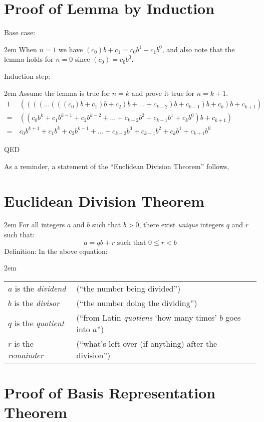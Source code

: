 \documentclass{article}
\newenvironment{jprIn}{\begin{adjustwidth}{2em}{}}{\end{adjustwidth}}
\begin{document}
\section*{Proof of Lemma by Induction}
Base case:
\begin{jprIn}
When \(n=1\) we have \((c_0)b + c_1 = c_0b^1 + c_1b^0\), and
also note that the lemma holds for \(n=0\) since \((c_0) = c_0b^0\).
\end{jprIn}
Induction step:
\begin{jprIn}
Assume the lemma is true for \(n=k\) and prove it true for \(n=k+1\).
{\small
\begin{alignat*}{1}
&((((\dots{}(((c_0)b + c_1)b + c_2)b + \dots{} + c_{k-2})b + c_{k-1})b + c_k)b + c_{k+1})\\
=\  &((c_0b^k + c_1b^{k-1} + c_2b^{k-2} + \dots{} + c_{k-2}b^2 + c_{k-1}b^1 + c_{k}b^0)b + c_{k+1})\\
=\  &c_0b^{k+1} + c_1b^{k} + c_2b^{k-1} + \dots{} + c_{k-2}b^3 + c_{k-1}b^2 + c_{k}b^1 + c_{k+1}b^0
\end{alignat*}
}
\end{jprIn}
QED

As a reminder, a statement of the ``Euclidean Division Theorem'' follows,
\section*{Euclidean Division Theorem}
\begin{jprIn}
For all integers \(a\) and \(b\) such that \(b>0\),
there exist \emph{unique} integers \(q\) and \(r\) such that:
\[a=qb+r  \text{ such that } 0\le{}r<b\]
Definition: In the above equation:
\begin{jprIn}
\begin{tabular}{l l}
\(a\) is the \emph{dividend} & (``the number being divided'')\\
\(b\) is the \emph{divisor} & (``the number doing the dividing'')\\
\(q\) is the \emph{quotient} & (``from Latin \emph{quotiens} `how many times' \(b\) goes into \(a\)'')\\
\(r\) is the \emph{remainder} & (``what's left over (if anything) after the division'')
\end{tabular}
\end{jprIn}
\end{jprIn}

\section*{Proof of Basis Representation Theorem}
\end{document}
